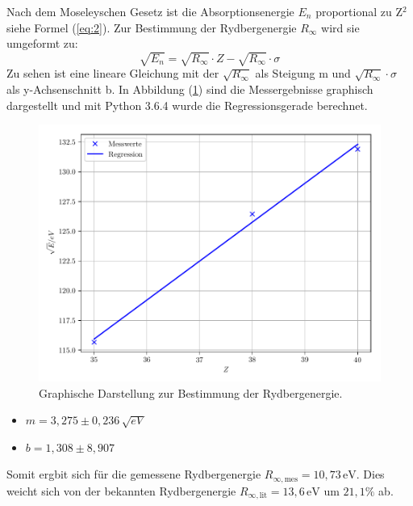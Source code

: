 Nach dem Moseleyschen Gesetz ist die Absorptionsenergie $E_n$ proportional zu Z$^2$ siehe Formel (\ref{eq:2}).
Zur Bestimmung der Rydbergenergie $R_\infty$ wird sie umgeformt zu:
\begin{equation*}
  \sqrt{E_n} = \sqrt{R_\infty} \cdot Z - \sqrt{R_\infty} \cdot \sigma
\end{equation*}
Zu sehen ist eine lineare Gleichung mit der $\sqrt{R_\infty}$ als Steigung m und $\sqrt{R_\infty} \cdot \sigma$ als
y-Achsenschnitt b.
In Abbildung (\ref{abb:3}) sind die Messergebnisse graphisch dargestellt und mit Python 3.6.4 wurde
die Regressionsgerade berechnet.
\begin{figure}[H]
  \includegraphics[width=\textwidth]{plot1.pdf}
  \caption{Graphische Darstellung zur Bestimmung der Rydbergenergie.}
  \label{abb:3}
\end{figure}
\begin{itemize}
  \item $m =  3,275 \pm 0,236 \, \text{$\sqrt{eV}$}$
  \item $b =  1,308 \pm 8,907$
\end{itemize}
Somit ergbit sich für die gemessene Rydbergenergie $R_{\infty,\text{mes}} = 10,73 \, \text{eV}$.
Dies weicht sich von der bekannten Rydbergenergie $R_{\infty, \text{lit}} = 13,6 \, \text{eV}$
um $21,1 \%$ ab.


